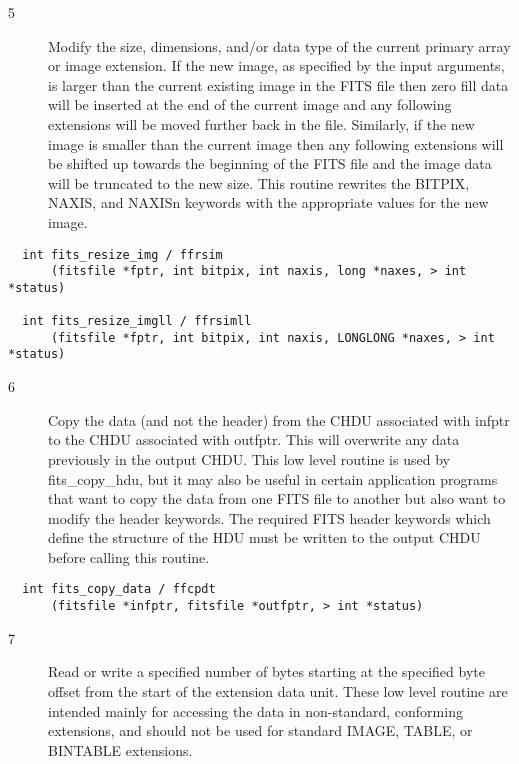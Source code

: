 \documentclass[11pt]{book}
\begin{document}
\begin{description}
\item[5 ] Modify the size, dimensions, and/or data type of the current
    primary array or image extension. If the new image, as specified
    by the input arguments, is larger than the current existing image
    in the FITS file then zero fill data will be inserted at the end
    of the current image and any following extensions will be moved
    further back in the file.  Similarly, if the new image is
    smaller than the current image then any following extensions
    will be shifted up towards the beginning of the FITS file
    and the image data will be truncated to the new size.
    This routine rewrites the BITPIX, NAXIS, and NAXISn keywords
   with the appropriate values for the new image. \label{ffrsim}
\end{description}

\begin{verbatim}
  int fits_resize_img / ffrsim
      (fitsfile *fptr, int bitpix, int naxis, long *naxes, > int *status)

  int fits_resize_imgll / ffrsimll
      (fitsfile *fptr, int bitpix, int naxis, LONGLONG *naxes, > int *status)
\end{verbatim}

\begin{description}
\item[6 ] Copy the data (and not the header) from the CHDU associated with infptr
    to the CHDU associated with outfptr. This will overwrite any data
    previously in the output CHDU.  This low level routine is used by
    fits\_copy\_hdu, but it may also be useful in certain application programs
    that want to copy the data from one FITS file to another but also
    want to modify the header keywords. The required FITS header keywords
    which define the structure of the HDU must be written to the
   output CHDU before calling this routine. \label{ffcpdt}
\end{description}

\begin{verbatim}
  int fits_copy_data / ffcpdt
      (fitsfile *infptr, fitsfile *outfptr, > int *status)
\end{verbatim}

\begin{description}
\item[7 ] Read or write a specified number of bytes starting at the specified byte
    offset from the start of the extension data unit.  These low
    level routine are intended mainly for accessing the data in
    non-standard, conforming extensions, and should not be used for standard
   IMAGE, TABLE, or BINTABLE extensions. \label{ffgextn}
\end{description}
\end{document}
